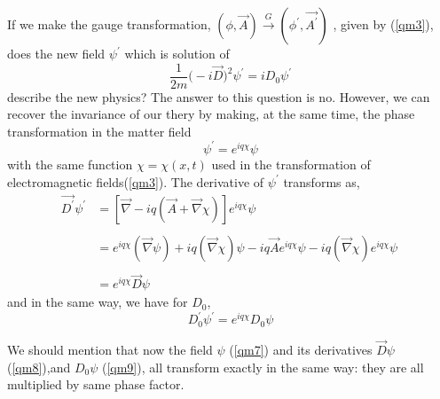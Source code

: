 If we make the gauge transformation, $(\phi ,\vec{A}) \xrightarrow{G} (\phi^{'},\vec{A^{'}})$ , given by (\ref{qm3}), does the new field $\psi^{'}$ which is solution of 
$$\frac{1}{2m}\big(-i\vec{D}\big)^2\psi^{'} = iD_0\psi^{'}$$
describe the new physics?
	The answer to this question is no. However, we can recover the invariance of our thery by making, at the same time, the phase transformation in the matter field 
\begin{equation} \label{qm7}
\psi^{'} = e^{iq\chi}\psi
\end{equation}
with the same function $\chi = \chi(x,t)$ used in the transformation of electromagnetic fields(\ref{qm3}). The derivative of $\psi^{'}$ transforms as,
\begin{equation}\label{qm8}
\begin{aligned}
\vec{D^{'}}\psi^{'} &= \left[ \vec{\nabla} - iq(\vec{A} + \vec{\nabla}\chi) \right] e^{iq\chi}\psi \\
\\
& = e^{iq\chi} (\vec{\nabla}\psi) + iq(\vec{\nabla}\chi)\psi - iq\vec{A} e^{iq\chi}\psi - iq(\vec{\nabla}\chi) e^{iq\chi}\psi \
\\
\\
& = e^{iq\chi}\vec{D}\psi
\end{aligned}
\end{equation}
and in the same way, we have for $D_0$,
\begin{equation} \label{qm9}
D_{0}^{'} \psi^{'} = e^{i q \chi} D_{0} \psi
\end{equation}

We should mention that now the field $\psi$ (\ref{qm7}) and its derivatives $\vec{D}\psi$ (\ref{qm8}),and $D_0\psi$ (\ref{qm9}), all transform exactly in the same way: they are all multiplied by same phase factor.

